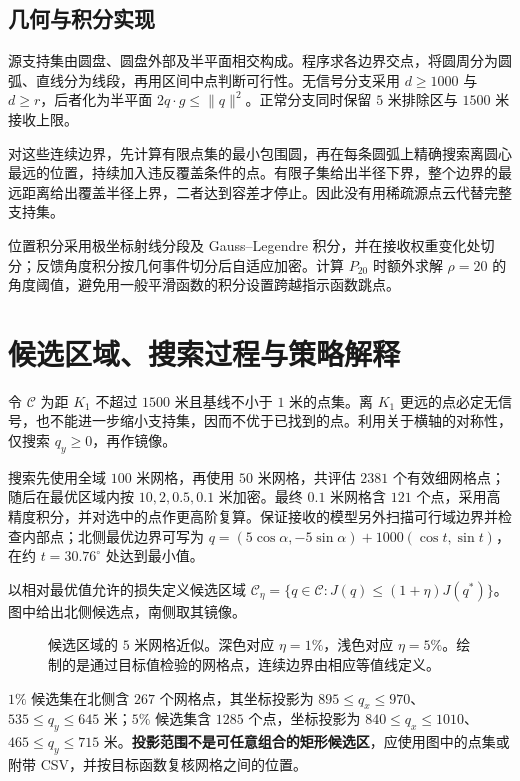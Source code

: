 \documentclass[UTF8,a4paper,zihao=5,fontset=none]{ctexart}
\begin{document}
\subsection{几何与积分实现}
源支持集由圆盘、圆盘外部及半平面相交构成。程序求各边界交点，将圆周分为圆弧、直线分为线段，再用区间中点判断可行性。无信号分支采用 \(d\ge1000\) 与 \(d\ge r\)，后者化为半平面 \(2q\cdot g\le\|q\|^2\)。正常分支同时保留 \(5\) 米排除区与 \(1500\) 米接收上限。

对这些连续边界，先计算有限点集的最小包围圆，再在每条圆弧上精确搜索离圆心最远的位置，持续加入违反覆盖条件的点。有限子集给出半径下界，整个边界的最远距离给出覆盖半径上界，二者达到容差才停止。因此没有用稀疏源点云代替完整支持集。

位置积分采用极坐标射线分段及 Gauss--Legendre 积分，并在接收权重变化处切分；反馈角度积分按几何事件切分后自适应加密。计算 \(P_{20}\) 时额外求解 \(\rho=20\) 的角度阈值，避免用一般平滑函数的积分设置跨越指示函数跳点。

\newpage
\section{候选区域、搜索过程与策略解释}
令 \(\mathcal C\) 为距 \(K_1\) 不超过 \(1500\) 米且基线不小于 \(1\) 米的点集。离 \(K_1\) 更远的点必定无信号，也不能进一步缩小支持集，因而不优于已找到的点。利用关于横轴的对称性，仅搜索 \(q_y\ge0\)，再作镜像。

搜索先使用全域 \(100\) 米网格，再使用 \(50\) 米网格，共评估 \(2381\) 个有效细网格点；随后在最优区域内按 \(10,2,0.5,0.1\) 米加密。最终 \(0.1\) 米网格含 \(121\) 个点，采用高精度积分，并对选中的点作更高阶复算。保证接收的模型另外扫描可行域边界并检查内部点；北侧最优边界可写为 \(q=(5\cos\alpha,-5\sin\alpha)+1000(\cos t,\sin t)\)，在约 \(t=30.76^\circ\) 处达到最小值。

以相对最优值允许的损失定义候选区域 \(\mathcal C_\eta=\{q\in\mathcal C:J(q)\le(1+\eta)J(q^*)\}\)。图中给出北侧候选点，南侧取其镜像。
\begin{figure}[H]\centering

\caption{候选区域的 \(5\) 米网格近似。深色对应 \(\eta=1\%\)，浅色对应 \(\eta=5\%\)。绘制的是通过目标值检验的网格点，连续边界由相应等值线定义。}
\end{figure}

\(1\%\) 候选集在北侧含 \(267\) 个网格点，其坐标投影为 \(895\le q_x\le970\)、\(535\le q_y\le645\) 米；\(5\%\) 候选集含 \(1285\) 个点，坐标投影为 \(840\le q_x\le1010\)、\(465\le q_y\le715\) 米。\textbf{投影范围不是可任意组合的矩形候选区}，应使用图中的点集或附带 CSV，并按目标函数复核网格之间的位置。
\end{document}
